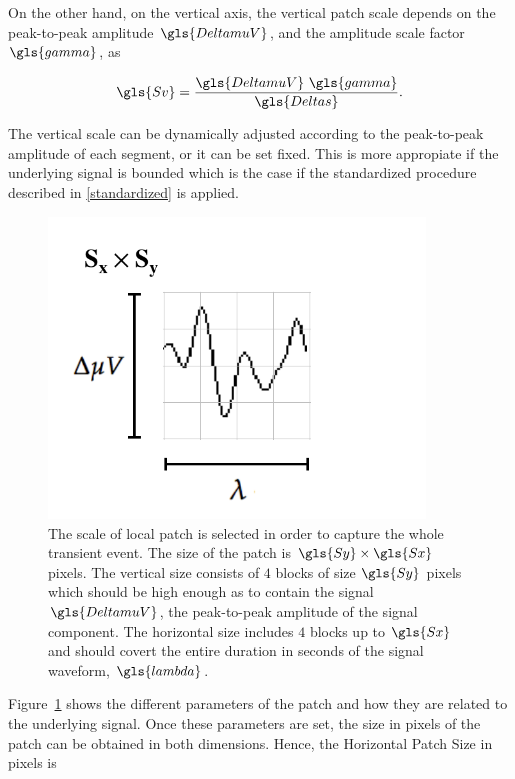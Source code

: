 On the other hand, on the vertical axis, the vertical patch scale depends on the peak-to-peak amplitude $\gls{DeltamuV}$, and the amplitude scale factor $\gls{gamma}$, as

\begin{equation}
\gls{Sv} = \frac{\gls{DeltamuV} \ \gls{gamma}}{\gls{Deltas}}.
\label{eq:verticalpatchscale}
\end{equation}

The vertical scale can be dynamically adjusted according to the peak-to-peak amplitude of each segment, or it can be set fixed.  This is more appropiate if the underlying signal is bounded which is the case if the standardized procedure described in \ref{standardized} is applied.

\begin{figure}[h!]
\centering
\includegraphics[width=10cm]{images/patchgeometry.pdf}
\caption[Patch Geometry]{The scale of local patch is selected in order to capture the whole transient event.  The size of the patch is $\gls{Sy} \times \gls{Sx}$ pixels. The vertical size consists of $4$ blocks of size $\gls{Sy}$ pixels which should be high enough as to contain the signal $\gls{DeltamuV}$, the peak-to-peak amplitude of the signal component. The horizontal size includes $4$ blocks up to $\gls{Sx}$ and should covert the entire duration in seconds of the signal waveform, $ \gls{lambda} $.   }
\label{fig:patchgeometry}
\end{figure}

Figure~\ref{fig:patchgeometry} shows the different parameters of the patch and how they are related to the underlying signal. Once these parameters are set, the size in pixels of the patch can be obtained in both dimensions.  Hence, the Horizontal Patch Size in pixels is

